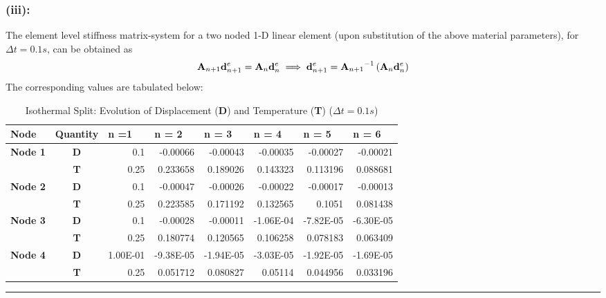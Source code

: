 \subsubsection*{(iii):}
The element level stiffness matrix-system for a two noded 1-D linear element (upon substitution of the above material parameters), for $\Delta t = 0.1s$, can be obtained as 
\begin{align*}
{\bf A}_{n+1}
{\bf d}^e_{n+1}
=
{\bf A}_{n}
{\bf d}^e_{n} \implies {\bf d}^e_{n+1} = {{\bf A}_{n+1}}^{-1}
\left( 
{\bf A}_{n}
{\bf d}^e_{n}
\right)
\end{align*}
The corresponding values are tabulated below: 
\begin{table}[htbp]
  \centering
  \caption{Isothermal Split: Evolution of Displacement ({\bf D}) and Temperature ({\bf T}) ($\Delta t = 0.1s$)}
    \begin{tabular}{rcrrrrrr}
    \toprule
    \multicolumn{1}{l}{\textbf{Node }} & \multicolumn{1}{l}{\textbf{Quantity}} & \multicolumn{1}{l}{\textbf{n =1 }} & \multicolumn{1}{l}{\textbf{n = 2 }} & \multicolumn{1}{l}{\textbf{n = 3}} & \multicolumn{1}{l}{\textbf{n = 4}} & \multicolumn{1}{l}{\textbf{n = 5}} & \multicolumn{1}{l}{\textbf{n = 6}} \\
    \midrule
    \multicolumn{1}{l}{\textbf{Node 1}} & \textbf{D} & 0.1   & -0.00066 & -0.00043 & -0.00035 & -0.00027 & -0.00021 \\
          & \textbf{T} & 0.25  & 0.233658 & 0.189026 & 0.143323 & 0.113196 & 0.088681 \\
    \multicolumn{1}{l}{\textbf{Node 2}} & \textbf{D} & 0.1   & -0.00047 & -0.00026 & -0.00022 & -0.00017 & -0.00013 \\
          & \textbf{T} & 0.25  & 0.223585 & 0.171192 & 0.132565 & 0.1051 & 0.081438 \\
    \multicolumn{1}{l}{\textbf{Node 3}} & \textbf{D} & 0.1   & -0.00028 & -0.00011 & -1.06E-04 & -7.82E-05 & -6.30E-05 \\
          & \textbf{T} & 0.25  & 0.180774 & 0.120565 & 0.106258 & 0.078183 & 0.063409 \\
    \multicolumn{1}{l}{\textbf{Node 4}} & \textbf{D} & 1.00E-01 & -9.38E-05 & -1.94E-05 & -3.03E-05 & -1.92E-05 & -1.69E-05 \\
          & \textbf{T} & 0.25  & 0.051712 & 0.080827 & 0.05114 & 0.044956 & 0.033196 \\
    \bottomrule
    \end{tabular}%
  \label{tab:addlabel}%
\end{table}\hrule
